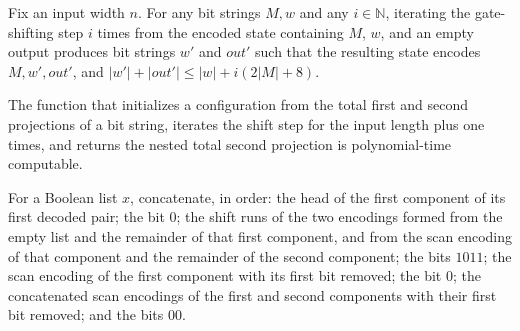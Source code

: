 \begin{theorem}
\label{Randomized.PIT.iterate_shStep_le}
\leanok
{}
Fix an input width $n$. For any bit strings $M,w$ and any $i\in\mathbb{N}$, iterating
the gate-shifting step $i$ times from the encoded state containing $M$, $w$, and an
empty output produces bit strings $w'$ and $out'$ such that the resulting state encodes
$M,w',out'$, and $|w'|+|out'|\le |w|+i(2|M|+8)$.
\end{theorem}

\begin{theorem}
\label{Randomized.PIT.polyTimeComputable_shiftRun}
\leanok
{}
The function that initializes a configuration from the total first and second
projections of a bit string, iterates the shift step for the input length plus one
times, and returns the nested total second projection is polynomial-time computable.
\end{theorem}

\begin{definition}
\label{Randomized.PIT.subW}
\leanok
{}
For a Boolean list $x$, concatenate, in order: the head of the first component of its
first decoded pair; the bit $0$; the shift runs of the two encodings formed from the
empty list and the remainder of that first component, and from the scan encoding of that
component and the remainder of the second component; the bits $1011$; the scan encoding
of the first component with its first bit removed; the bit $0$; the concatenated scan
encodings of the first and second components with their first bit removed; and the bits
$00$.
\end{definition}


